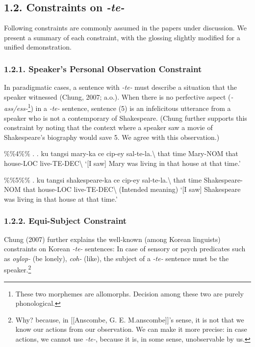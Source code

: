 \hypertarget{constraints-on--te-}{%
\subsection{\texorpdfstring{1.2. Constraints on
\emph{-te-}}{1.2. Constraints on -te-}}\label{constraints-on--te-}}

Following constraints are commonly assumed in the papers under
discussion. We present a summary of each constraint, with the glossing
slightly modified for a unified demonstration.

\hypertarget{speakers-personal-observation-constraint}{%
\subsubsection{1.2.1. Speaker's Personal Observation
Constraint}\label{speakers-personal-observation-constraint}}

In paradigmatic cases, a sentence with \emph{-te-} must describe a
situation that the speaker witnessed (Chung, 2007; a.o.). When there is
no perfective aspect (\emph{-ass/ess-}\footnote{These two morphemes are
  allomorphs. Decision among these two are purely phonological.}) in a
\emph{-te-} sentence, sentence (5) is an infelicitous utterance from a
speaker who is not a contemporary of Shakespeare. (Chung further
supports this constraint by noting that the context where a speaker saw
a movie of Shakespeare's biography would save 5. We agree with this
observation.)

\%\%4\%\% \ex. \gll. ku tangsi mary-ka ce cip-ey
sal-te-la.\textbackslash{} that time Mary-NOM that house-LOC
live-TE-DEC\textbackslash{} `{[}I saw{]} Mary was living in that house
at that time.'

\%\%5\%\% \ex. \gll *ku tangsi shakespeare-ka ce cip-ey
sal-te-la.\textbackslash{} that time Shakespeare-NOM that house-LOC
live-TE-DEC\textbackslash{} (Intended meaning) `{[}I saw{]} Shakespeare
was living in that house at that time.'

\hypertarget{equi-subject-constraint}{%
\subsubsection{1.2.2. Equi-Subject
Constraint}\label{equi-subject-constraint}}

Chung (2007) further explains the well-known (among Korean linguists)
constraints on Korean \emph{-te-} sentences: In case of sensory or psych
predicates such as \emph{oylop-} (be lonely), \emph{coh-} (like), the
subject of a \emph{-te-} sentence must be the speaker.\footnote{Why?
  because, in {[}{[}Anscombe, G. E. M.\textbar anscombe{]}{]}'s sense,
  it is not that we know our actions from our observation. We can make
  it more precise: in case actions, we cannot use \emph{-te-}, because
  it is, in some sense, unobservable by us.}

